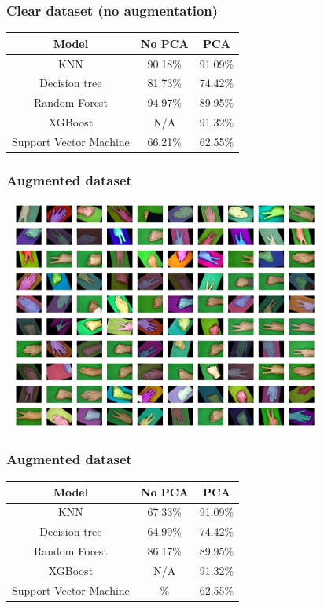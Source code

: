 \documentclass{beamer}
\begin{document}




\begin{frame}
  \frametitle{Clear dataset (no augmentation)}

  \begin{table}
    \centering
    \begin{tabular}{|c|c|c|}
      \hline
      \textbf{Model} & \textbf{No PCA} & \textbf{PCA} \\
      \hline
      KNN & 90.18\% & 91.09\% \\
      \hline
      Decision tree & 81.73\% & 74.42\% \\
      \hline
      Random Forest & 94.97\% & 89.95\% \\
      \hline
      XGBoost & N/A & 91.32\% \\
      \hline
      Support Vector Machine & 66.21\% & 62.55\% \\
      \hline
    \end{tabular}
  \end{table}

\end{frame}


\begin{frame}
  \frametitle{Augmented dataset}
\centering
\includegraphics[height=3in, width=4.2in]{images/augmented.png}
\end{frame}

\begin{frame}
  \frametitle{Augmented dataset}

  \begin{table}
    \centering
    \begin{tabular}{|c|c|c|}
      \hline
      \textbf{Model} & \textbf{No PCA} & \textbf{PCA} \\
      \hline
      KNN & 67.33\% & 91.09\% \\
      \hline
      Decision tree & 64.99\% & 74.42\% \\ 
      \hline
      Random Forest & 86.17\% & 89.95\% \\
      \hline
      XGBoost & N/A & 91.32\% \\
      \hline
      Support Vector Machine & \% & 62.55\% \\
      \hline
    \end{tabular}
  \end{table}

\end{frame}
\end{document}
